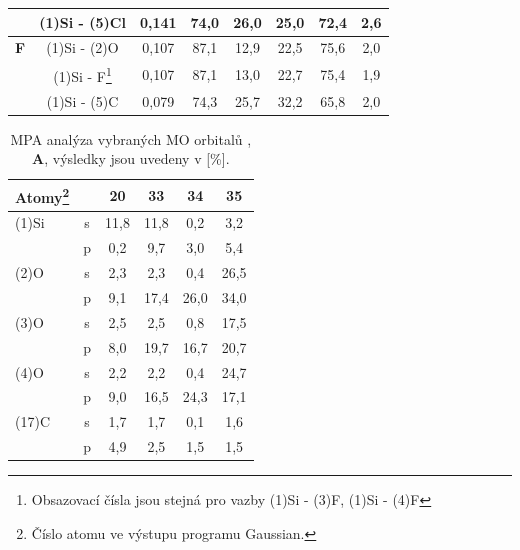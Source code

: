 \documentclass[
digital, %
table,   %
lof,     %
lot,     %
oneside,
]{fithesis3}
\begin{document}
\begin{table}[htbp]
\begin{minipage}{\textwidth}
\begin{center}
\begin{tabular}{|l|c|c|c|c|c|c|c|}
&  (1)Si - (5)Cl & 0,141 & 74,0  & 26,0  & 25,0  & 72,4  & 2,6  \\ \hline
\textbf{F}  & (1)Si - (2)O &0,107 & 87,1  & 12,9  & 22,5  & 75,6  & 2,0  \\ \hline
& (1)Si - F\footnote{ Obsazovací čísla jsou stejná pro vazby (1)Si - (3)F, (1)Si - (4)F} & 0,107 & 87,1  & 13,0  & 22,7  & 75,4  & 1,9  \\ \hline
& (1)Si - (5)C &0,079 & 74,3  & 25,7  & 32,2  & 65,8  & 2,0  \\ \hline
\end{tabular}
\end{center}
\end{minipage}
\end{table}

\begin{table}[htbp]\begin{minipage}{\textwidth}
\caption{MPA analýza vybraných MO orbitalů , \textbf{A}, výsledky jsou uvedeny v [\%].}
\begin{center}
\begin{tabular}{|l|c|c|c|c|c|}
\hline
Atomy\footnote{Číslo atomu ve výstupu programu Gaussian.} \label{si_ch3_och3_MPA}&  & 20 & 33 & 34 & 35 \\ \hline
(1)Si & s & 11,8 & 11,8 & 0,2 & 3,2 \\ \hline
& p & 0,2 & 9,7 & 3,0 & 5,4 \\ \hline
(2)O & s & 2,3 & 2,3 & 0,4 & 26,5 \\ \hline
& p & 9,1 & 17,4 & 26,0 & 34,0 \\ \hline
(3)O & s & 2,5 & 2,5 & 0,8 & 17,5 \\ \hline
& p & 8,0 & 19,7 & 16,7 & 20,7 \\ \hline
(4)O & s & 2,2 & 2,2 & 0,4 & 24,7 \\ \hline
& p & 9,0 & 16,5 & 24,3 & 17,1 \\ \hline
(17)C & s & 1,7 & 1,7 & 0,1 & 1,6 \\ \hline
& p & 4,9 & 2,5 & 1,5 & 1,5 \\ \hline
\end{tabular}
\end{center}
\end{minipage}
\end{table}
\end{document}
